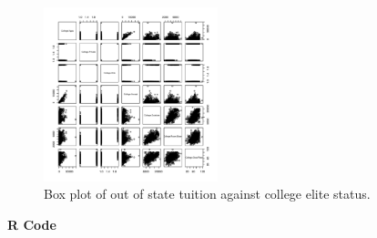\documentclass{article}\usepackage[]{graphicx}\usepackage[]{color}
\newenvironment{knitrout}{}{} %
\begin{document}
\begin{figure} %
\centering
\begin{knitrout}
\color{fgcolor}
\includegraphics[width=0.45\textwidth]{figure/unnamed-chunk-2-1} 

\end{knitrout}
\caption{Box plot of out of state tuition against college elite status.}
\label{boxplot}
\end{figure}

\lipsum[1]
\lipsum[2]


\newpage
\noindent \Large{{\bf R Code}}

\end{document}
